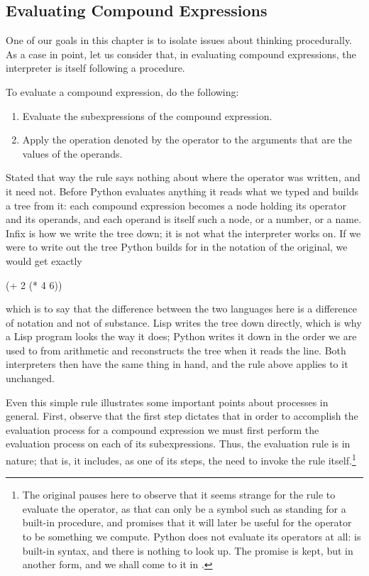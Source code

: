 \subsection{Evaluating Compound Expressions}
\label{Section 1.1.3}

One of our goals in this chapter is to isolate issues about thinking
procedurally.  As a case in point, let us consider that, in evaluating compound
expressions, the interpreter is itself following a procedure.

To evaluate a compound expression, do the following:

\begin{enumerate}

\item
Evaluate the subexpressions of the compound expression.

\item
Apply the operation denoted by the operator to the arguments that are the
values of the operands.

\end{enumerate}

\noindent
Stated that way the rule says nothing about where the operator was written, and
it need not.  Before Python evaluates anything it reads what we typed and
builds a tree from it: each compound expression becomes a node holding its
operator and its operands, and each operand is itself such a node, or a number,
or a name.  Infix is how we write the tree down; it is not what the interpreter
works on.  If we were to write out the tree Python builds for 
in the notation of the original, we would get exactly

\begin{syntaxForm}
(+ 2 (* 4 6))
\end{syntaxForm}

\noindent
which is to say that the difference between the two languages here is a
difference of notation and not of substance.  Lisp writes the tree down
directly, which is why a Lisp program looks the way it does; Python writes it
down in the order we are used to from arithmetic and reconstructs the tree when
it reads the line.  Both interpreters then have the same thing in hand, and the
rule above applies to it unchanged.

Even this simple rule illustrates some important points about processes in
general.  First, observe that the first step dictates that in order to
accomplish the evaluation process for a compound expression we must first
perform the evaluation process on each of its subexpressions.  Thus, the
evaluation rule is  in nature; that is, it includes, as one
of its steps, the need to invoke the rule itself.\footnote{The original pauses
here to observe that it seems strange for the rule to evaluate the operator, as
that can only be a symbol such as \code{+} standing for a built-in procedure,
and promises that it will later be useful for the operator to be something we
compute.  Python does not evaluate its operators at all: \code{+} is built-in
syntax, and there is nothing to look up.  The promise is kept, but in another
form, and we shall come to it in .}

